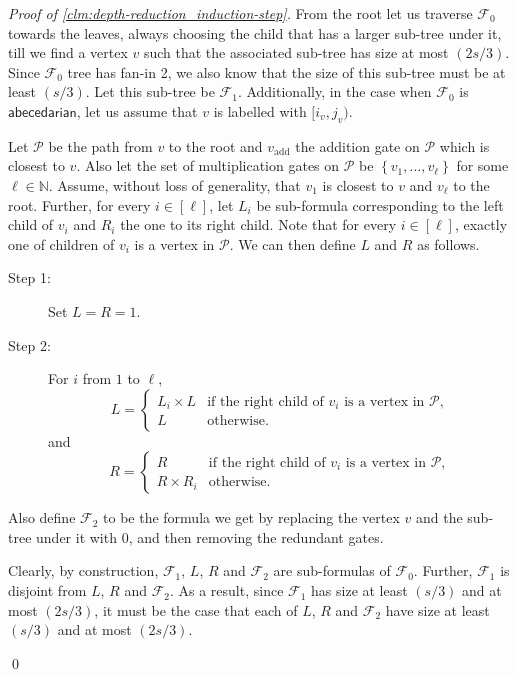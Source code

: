 \documentclass[10pt,a4paper]{article}
\def\Natural{\mathbb{N}}
\let\N\Natural
\def\set#1{\left\{ #1 \right\}}
\newcommand{\form}{\textbf{$\mathcal{F}$}}
\newcommand{\abcd}{\mathsf{abecedarian}}
\newenvironment{proofof}[1]{\medskip\noindent\emph{Proof of #1.}\hspace*{1em}}{\qed\bigskip}
\begin{document}
\begin{proofof}{\autoref{clm:depth-reduction_induction-step}}
%
	From the root let us traverse $\form_0$ towards the leaves, always choosing the child that has a larger sub-tree under it, till we find a vertex $v$ such that the associated sub-tree has size at most $(2s/3)$. 
	Since $\form_0$ tree has fan-in 2, we also know that the size of this sub-tree must be at least $(s/3)$. 
	Let this sub-tree be $\form_1$. 
	Additionally, in the case when $\form_0$ is $\abcd$, let us assume that $v$ is labelled with $[i_v,j_v)$.
	
	Let $\mathcal{P}$ be the path from $v$ to the root and $v_{\text{add}}$ the addition gate on $\mathcal{P}$ which is closest to $v$.
	Also let the set of multiplication gates on $\mathcal{P}$ be $\set{v_1, \ldots, v_\ell}$ for some $\ell \in \N$.
	Assume, without loss of generality, that $v_1$ is closest to $v$ and $v_\ell$ to the root.
	Further, for every $i \in [\ell]$, let $L_i$ be sub-formula corresponding to the left child of $v_i$ and $R_i$ the one to its right child.
	Note that for every $i \in [\ell]$, exactly one of children of $v_i$ is a vertex in $\mathcal{P}$.
	We can then define $L$ and $R$ as follows.
	\begin{description}
		\item[Step 1:] Set $L = R = 1$.
		\item[Step 2:] For $i$ from $1$ to $\ell$,
		    \[
		        L =
		        \begin{cases}
                   	L_i \times L & \text{if the right child of $v_i$ is a vertex in $\mathcal{P}$,}\\
                  	L & \text{otherwise.}
                \end{cases}
            \]
            and
            \[
            	R = 
            	\begin{cases}
                   	R & \text{if the right child of $v_i$ is a vertex in $\mathcal{P}$,}\\
                  	R \times R_i & \text{otherwise.}
                \end{cases}
            \]
	\end{description}
	
	\noindent Also define $\form_2$ to be the formula we get by replacing the vertex $v$ and the sub-tree under it with $0$, and then removing the redundant gates.
		
	Clearly, by construction, $\form_1$, $L$, $R$ and $\form_2$ are sub-formulas of $\form_0$.
	Further, $\form_1$ is disjoint from $L$, $R$ and $\form_2$. 
	As a result, since $\form_1$ has size at least $(s/3)$ and at most $(2s/3)$, it must be the case that each of $L$, $R$ and $\form_2$ have size at least $(s/3)$ and at most $(2s/3)$.


\end{proofof}
\end{document}
